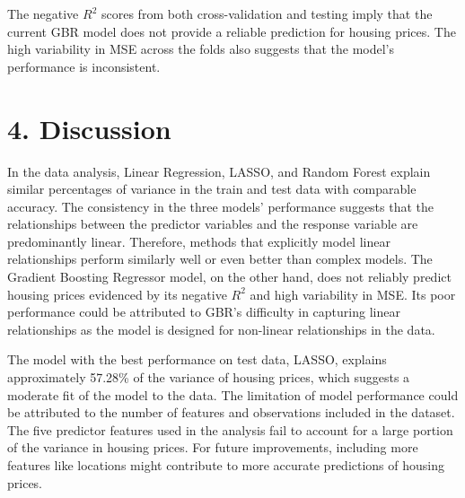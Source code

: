 \documentclass[12pt, letterpaper]{report}
\begin{document}
The negative $R^2$ scores from both cross-validation and testing imply that the current GBR model does not provide a reliable prediction for housing prices. The high variability in MSE across the folds also suggests that the model's performance is inconsistent.
\vspace{-0.55cm}
\section*{4. Discussion}
In the data analysis, Linear Regression, LASSO, and Random Forest explain similar percentages of variance in the train and test data with comparable accuracy. The consistency in the three models’ performance suggests that the relationships between the predictor variables and the response variable are predominantly linear. Therefore, methods that explicitly model linear relationships perform similarly well or even better than complex models. The Gradient Boosting Regressor model, on the other hand, does not reliably predict housing prices evidenced by its negative $R^2$ and high variability in MSE. Its poor performance could be attributed to GBR’s difficulty in capturing linear relationships as the model is designed for non-linear relationships in the data. 

The model with the best performance on test data, LASSO, explains approximately 57.28\% of the variance of housing prices, which suggests a moderate fit of the model to the data. The limitation of model performance could be attributed to the number of features and observations included in the dataset. The five predictor features used in the analysis fail to account for a large portion of the variance in housing prices. For future improvements, including more features like locations might contribute to more accurate predictions of housing prices.

\end{document}
